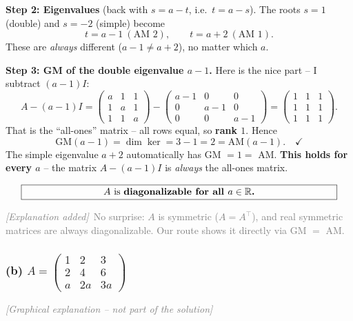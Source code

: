 \documentclass[a4paper,12pt]{article}
\newcommand{\grafik}{\textcolor{gray}{\small\textit{[Graphical explanation -- not part of the solution]}}}
\newcommand{\erglerk}{\textcolor{gray}{\small\textit{[Explanation added]}}}
\begin{document}
\textbf{Step 2: Eigenvalues} (back with $s = a - t$, i.e.\ $t = a - s$). The roots $s = 1$ (double) and $s = -2$ (simple) become
\[
t = a - 1 \ (\text{AM } 2), \qquad t = a + 2 \ (\text{AM } 1).
\]
These are \emph{always} different ($a - 1 \neq a + 2$), no matter which $a$.

\textbf{Step 3: GM of the double eigenvalue $a-1$.} Here is the nice part -- I subtract $(a-1)I$:
\[
A - (a-1)I = \begin{pmatrix} a & 1 & 1 \\ 1 & a & 1 \\ 1 & 1 & a \end{pmatrix} - \begin{pmatrix} a-1 & 0 & 0 \\ 0 & a-1 & 0 \\ 0 & 0 & a-1 \end{pmatrix} = \begin{pmatrix} 1 & 1 & 1 \\ 1 & 1 & 1 \\ 1 & 1 & 1 \end{pmatrix}.
\]
That is the ``all-ones'' matrix -- all rows equal, so \textbf{rank $1$}. Hence
\[
\text{GM}(a-1) = \dim\ker = 3 - 1 = 2 = \text{AM}(a-1). \quad\checkmark
\]
The simple eigenvalue $a+2$ automatically has GM $= 1 =$ AM. \textbf{This holds for every $a$} -- the matrix $A - (a-1)I$ is \emph{always} the all-ones matrix.

\[
\fbox{\parbox{0.93\textwidth}{\centering
$A$ is \textbf{diagonalizable for all $a \in \mathbb{R}$.}
}}
\]

\erglerk\ \textcolor{gray}{\small No surprise: $A$ is symmetric ($A = A^\top$), and real symmetric matrices are always diagonalizable. Our route shows it directly via GM $=$ AM.}

\subsubsection*{(b) $A = \left(\begin{smallmatrix} 1 & 2 & 3 \\ 2 & 4 & 6 \\ a & 2a & 3a \end{smallmatrix}\right)$}

\grafik
\end{document}
